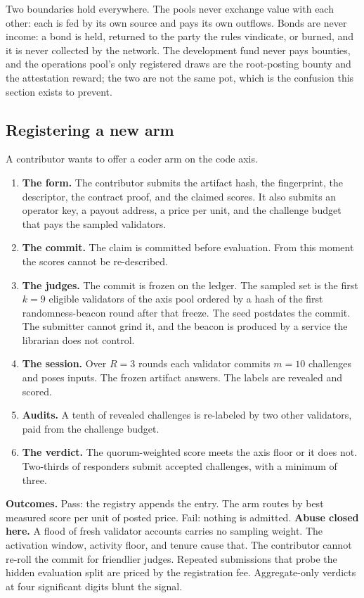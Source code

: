 \documentclass[11pt]{article}
\begin{document}
Two boundaries hold everywhere. The pools never exchange value
with each other: each is fed by its own source and pays its own
outflows. Bonds are never income: a bond is held, returned to
the party the rules vindicate, or burned, and it is never
collected by the network. The development fund never pays
bounties, and the operations pool's only registered draws are
the root-posting bounty and the attestation reward; the two are
not the same pot, which is the
confusion this section exists to prevent.

\subsection{Registering a new arm}

A contributor wants to offer a coder arm on the code axis.
\begin{enumerate}
    \item \textbf{The form.} The contributor submits the artifact
          hash, the fingerprint, the descriptor, the contract proof, and
          the claimed scores. It also submits an operator key, a payout
          address, a price per unit, and the challenge budget that pays the
          sampled validators.
    \item \textbf{The commit.} The claim is committed before
          evaluation. From this moment the scores cannot be re-described.
    \item \textbf{The judges.} The commit is frozen on the ledger.
          The sampled set is the first $k=9$ eligible validators of the
          axis pool ordered by a hash of the first randomness-beacon round
          after that
          freeze. The seed postdates the commit. The submitter cannot grind
          it, and the beacon is produced by a service the librarian does
          not control.
    \item \textbf{The session.} Over $R=3$ rounds each validator
          commits $m=10$ challenges and poses inputs. The frozen artifact
          answers. The labels are revealed and scored.
    \item \textbf{Audits.} A tenth of revealed challenges is
          re-labeled by two other validators, paid from the challenge
          budget.
    \item \textbf{The verdict.} The quorum-weighted score meets the
          axis floor or it does not. Two-thirds of responders submit
          accepted challenges, with a minimum of three.
\end{enumerate}
\textbf{Outcomes.} Pass: the registry appends the entry. The arm
routes by best measured score per unit of posted price. Fail:
nothing is admitted. \textbf{Abuse closed here.} A flood of fresh
validator accounts carries no sampling weight. The activation
window, activity floor, and tenure cause that. The contributor
cannot re-roll the commit for friendlier judges. Repeated
submissions that probe the hidden evaluation split are priced by
the registration fee. Aggregate-only verdicts at four significant
digits blunt the signal.
\end{document}

